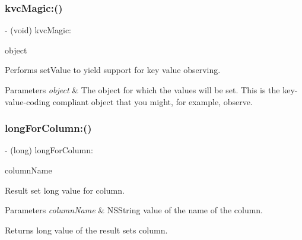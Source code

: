 \subsubsection{\texorpdfstring{kvc\+Magic\+:()}{kvcMagic:()}}
{\footnotesize\ttfamily -\/ (void) kvc\+Magic\+: \begin{DoxyParamCaption}\item[{(id)}]{object }\end{DoxyParamCaption}}

Performs {\ttfamily set\+Value} to yield support for key value observing.


\begin{DoxyParams}{Parameters}
{\em object} & The object for which the values will be set. This is the key-\/value-\/coding compliant object that you might, for example, observe. \\
\hline
\end{DoxyParams}
\mbox{\label{interface_o_p_t_l_y_f_m_d_b_result_set_a2bf75874eac8d72b119174865ab365f5}} 
\subsubsection{\texorpdfstring{long\+For\+Column\+:()}{longForColumn:()}}
{\footnotesize\ttfamily -\/ (long) long\+For\+Column\+: \begin{DoxyParamCaption}\item[{(N\+S\+String$\ast$)}]{column\+Name }\end{DoxyParamCaption}}

Result set {\ttfamily long} value for column.


\begin{DoxyParams}{Parameters}
{\em column\+Name} & {\ttfamily N\+S\+String} value of the name of the column.\\
\hline
\end{DoxyParams}
\begin{DoxyReturn}{Returns}
{\ttfamily long} value of the result set\textquotesingle{}s column. 
\end{DoxyReturn}
\mbox{\label{interface_o_p_t_l_y_f_m_d_b_result_set_a7d32a06b46ea37f2ef83ceaf93364c84}} 
